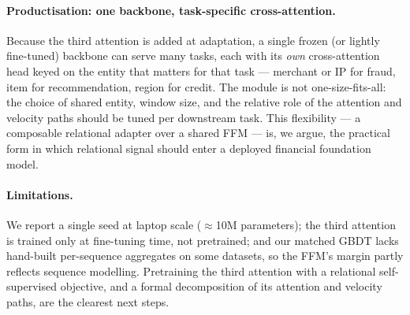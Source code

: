 \paragraph{Productisation: one backbone, task-specific cross-attention.} Because the third attention
is added at adaptation, a single frozen (or lightly fine-tuned) backbone can serve many tasks, each
with its \emph{own} cross-attention head keyed on the entity that matters for that task --- merchant
or IP for fraud, item for recommendation, region for credit. The module is not one-size-fits-all: the
choice of shared entity, window size, and the relative role of the attention and velocity paths
should be tuned per downstream task. This flexibility --- a composable relational adapter over a
shared FFM --- is, we argue, the practical form in which relational signal should enter a deployed
financial foundation model.

\paragraph{Limitations.} We report a single seed at laptop scale ($\approx$\num{10}M parameters); the
third attention is trained only at fine-tuning time, not pretrained; and our matched GBDT lacks
hand-built per-sequence aggregates on some datasets, so the FFM's margin partly reflects sequence
modelling. Pretraining the third attention with a relational self-supervised objective, and a formal
decomposition of its attention and velocity paths, are the clearest next steps.
